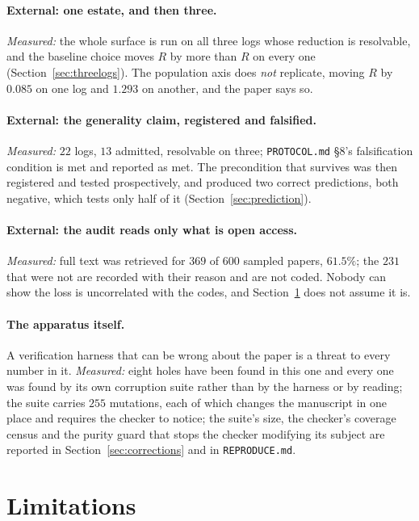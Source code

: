 \documentclass[preprint,12pt]{elsarticle}
\begin{document}
\paragraph{External: one estate, and then three.}
\emph{Measured:} the whole surface is run on all three logs whose reduction is
resolvable, and the baseline choice moves $R$ by more than $R$ on every one
(Section~\ref{sec:threelogs}). The population axis does \emph{not} replicate,
moving $R$ by $0.085$ on one log and $1.293$ on another, and the paper says
so.

\paragraph{External: the generality claim, registered and falsified.}
\emph{Measured:} $22$ logs, $13$ admitted, resolvable on three;
\texttt{PROTOCOL.md} \S8's falsification condition is met and reported as met.
The precondition that survives was then registered and tested prospectively,
and produced two correct predictions, both negative, which tests only half of
it (Section~\ref{sec:prediction}).

\paragraph{External: the audit reads only what is open access.}
\emph{Measured:} full text was retrieved for $369$ of $600$ sampled papers,
$61.5\%$; the $231$ that were not are recorded with their reason and are not
coded. Nobody can show the loss is uncorrelated with the codes, and
Section~\ref{sec:limits} does not assume it is.

\paragraph{The apparatus itself.}
A verification harness that can be wrong about the paper is a threat to every
number in it. \emph{Measured:} eight holes have been found in this one and
every one was found by its own corruption suite rather than by the harness or
by reading; the suite carries $255$ mutations, each of which changes the
manuscript in one place and requires the checker to notice; the suite's size, the checker's coverage census and the purity
guard that stops the checker modifying its subject are reported in
Section~\ref{sec:corrections} and in \texttt{REPRODUCE.md}.

\section{Limitations}
\label{sec:limits}
\end{document}
